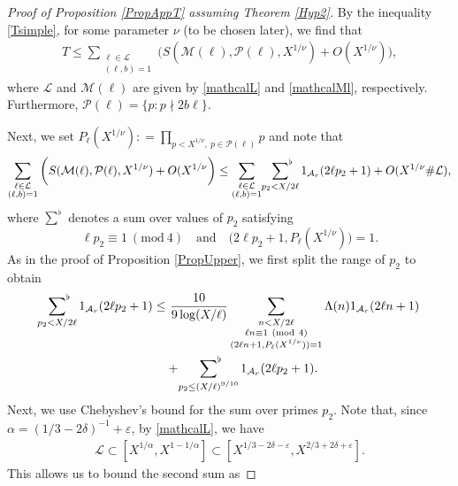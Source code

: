 \documentclass[12pt]{amsart}
\numberwithin{equation}{section}
\theoremstyle{remark}
\theoremstyle{definition}
\newcommand{\imod}[1]{\ (\mathrm{mod}\ #1)}
\begin{document}
\begin{proof}[Proof of Proposition \ref{PropAppT} assuming Theorem \ref{Hyp2}]
 By the inequality \eqref{Tsimple}, for some parameter $\nu$ (to be chosen later), we find that
\begin{align}
\label{T00} T\leq \sum_{\substack{\ell \in \mathcal{L}\\(\ell, b)=1}}\bigg( S(\mathcal{M}(\ell), \mathcal{P}(\ell), X^{1/\nu}) + O(X^{1/\nu})\bigg),
\end{align}
where $\mathcal{L}$ and $\mathcal{M}(\ell)$ are given by \eqref{mathcalL} and \eqref{mathcalMl}, respectively. Furthermore, $\mathcal{P}(\ell) = \{p: p\nmid 2b\ell\}$.  

Next, we set $P_\ell (X^{1/\nu}): = \prod_{p < X^{1/\nu},\: p\in \mathcal{P}(\ell)}p$ and note that
\begin{align}
\notag \sum_{\substack{\ell \in \mathcal{L}\\(\ell, b)=1}}\bigg( S(\mathcal{M}(\ell), \mathcal{P}(\ell), X^{1/\nu}) + O(X^{1/\nu}\bigg)\leq \sum_{\substack{\ell \in \mathcal{L}\\(\ell, b)=1}}\sideset{}{^\flat}\sum_{\substack{p_2< X/2\ell}}1_{\mathcal{A}_r}(2\ell p_2 +1)+ O(X^{1/\nu}\#\mathcal{L}),
\end{align}
where $\sum^\flat$ denotes a sum over values of $p_2$ satisfying  
\[\ell p_2\equiv 1\imod 4 \quad \text{and} \quad \big(2\ell p_2+1, P_{\ell}(X^{1/\nu})\big)=1.\]
As in the proof of Proposition \ref{PropUpper}, we first split the range of $p_2$ to obtain
\begin{align}
\notag \sideset{}{^\flat}\sum_{\substack{p_2< X/2\ell}}1_{\mathcal{A}_r}(2\ell p_2 +1) \leq &~\dfrac{10}{9\log (X/\ell)}\sum_{\substack{n< X/2\ell\\\ell n\equiv 1\imod 4\\ (2\ell n + 1, P_{\ell}(X^{1/\nu}))=1}}\Lambda(n)1_{\mathcal{A}_r}(2\ell n +1)\\
\notag  &+ \sideset{}{^\flat}\sum_{\substack{p_2\leq (X/\ell)^{9/10}}}1_{\mathcal{A}_r}(2\ell p_2 +1).
\end{align}
 Next, we use Chebyshev's bound \cite[Theorem 2.4]{kou} for the sum over primes $p_2$. Note that, since $\alpha=(1/3-2\delta)^{-1} + \varepsilon$, by \eqref{mathcalL}, we have 
\begin{align}\label{Range: L}
\mathcal{L} \subset [X^{1/\alpha}, X^{1-1/\alpha}] \subset[X^{1/3-2\delta-\varepsilon}, X^{2/3+2\delta +\varepsilon}].
\end{align}
This allows us to bound the second sum as

\end{proof}
\end{document}
